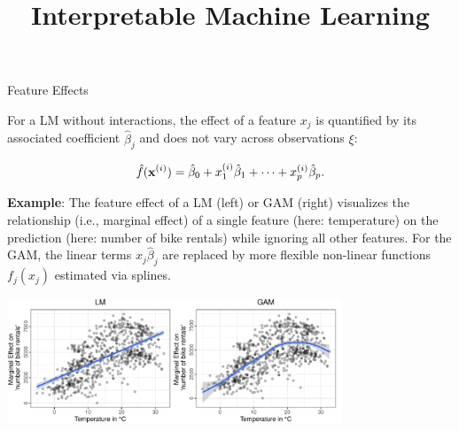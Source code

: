 \documentclass[11pt,compress,t,notes=noshow, aspectratio=169, xcolor=table]{beamer}
\title{Interpretable Machine Learning}
\date{}
\begin{document}



\begin{vbframe}{Feature Effects}

For a LM without interactions, the effect of a feature $x_j$ is quantified by its associated coefficient $\hat\beta_j$ and does not vary across observations $\xi$:

$$\fh(\xi) = \hat\beta_0 + x^{(i)}_1\hat\beta_1 + \dots + x^{(i)}_p\hat\beta_p.$$




\textbf{Example}: %
The feature effect of a LM (left) or GAM (right) visualizes the relationship (i.e., marginal effect) of a single feature (here: temperature) on the prediction (here: number of bike rentals) while ignoring all other features.
For the GAM, the linear terms $x_j\hat\beta_j$ are replaced by more flexible non-linear functions $f_j(x_j)$ estimated via splines.

\centering
\includegraphics[width=0.75\textwidth, trim=0cm 0.1cm 0cm 0cm, clip]{figure/lm_main_effects}

\end{vbframe}
\end{document}

